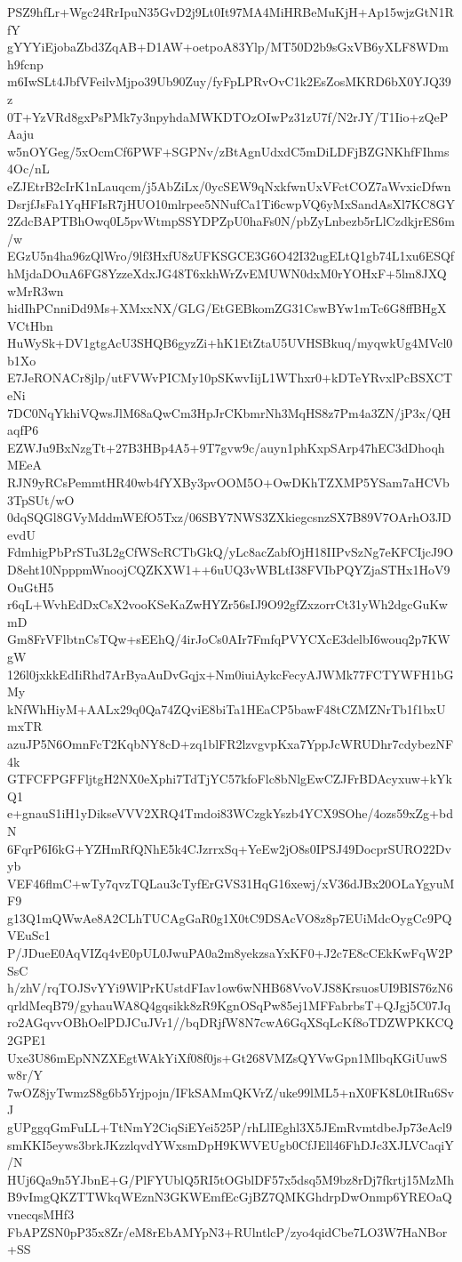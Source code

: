 PSZ9hfLr+Wgc24RrIpuN35GvD2j9Lt0It97MA4MiHRBeMuKjH+Ap15wjzGtN1RfY
gYYYiEjobaZbd3ZqAB+D1AW+oetpoA83Ylp/MT50D2b9sGxVB6yXLF8WDmh9fcnp
m6IwSLt4JbfVFeilvMjpo39Ub90Zuy/fyFpLPRvOvC1k2EsZosMKRD6bX0YJQ39z
0T+YzVRd8gxPsPMk7y3npyhdaMWKDTOzOIwPz31zU7f/N2rJY/T1Iio+zQePAaju
w5nOYGeg/5xOcmCf6PWF+SGPNv/zBtAgnUdxdC5mDiLDFjBZGNKhfFIhms4Oc/nL
eZJEtrB2cIrK1nLauqcm/j5AbZiLx/0ycSEW9qNxkfwnUxVFctCOZ7aWvxicDfwn
DsrjfJsFa1YqHFIsR7jHUO10mlrpee5NNufCa1Ti6cwpVQ6yMxSandAsXl7KC8GY
2ZdcBAPTBhOwq0L5pvWtmpSSYDPZpU0haFs0N/pbZyLnbezb5rLlCzdkjrES6m/w
EGzU5n4ha96zQlWro/9lf3HxfU8zUFKSGCE3G6O42I32ugELtQ1gb74L1xu6ESQf
hMjdaDOuA6FG8YzzeXdxJG48T6xkhWrZvEMUWN0dxM0rYOHxF+5lm8JXQwMrR3wn
hidIhPCnniDd9Ms+XMxxNX/GLG/EtGEBkomZG31CswBYw1mTc6G8ffBHgXVCtHbn
HuWySk+DV1gtgAcU3SHQB6gyzZi+hK1EtZtaU5UVHSBkuq/myqwkUg4MVcl0b1Xo
E7JeRONACr8jlp/utFVWvPICMy10pSKwvIijL1WThxr0+kDTeYRvxlPcBSXCTeNi
7DC0NqYkhiVQwsJlM68aQwCm3HpJrCKbmrNh3MqHS8z7Pm4a3ZN/jP3x/QHaqfP6
EZWJu9BxNzgTt+27B3HBp4A5+9T7gvw9c/auyn1phKxpSArp47hEC3dDhoqhMEeA
RJN9yRCsPemmtHR40wb4fYXBy3pvOOM5O+OwDKhTZXMP5YSam7aHCVb3TpSUt/wO
0dqSQGl8GVyMddmWEfO5Txz/06SBY7NWS3ZXkiegcsnzSX7B89V7OArhO3JDevdU
FdmhigPbPrSTu3L2gCfWScRCTbGkQ/yLc8acZabfOjH18IIPvSzNg7eKFCIjcJ9O
D8eht10NpppmWnoojCQZKXW1++6uUQ3vWBLtI38FVIbPQYZjaSTHx1HoV9OuGtH5
r6qL+WvhEdDxCsX2vooKSeKaZwHYZr56sIJ9O92gfZxzorrCt31yWh2dgcGuKwmD
Gm8FrVFlbtnCsTQw+sEEhQ/4irJoCs0AIr7FmfqPVYCXcE3delbI6wouq2p7KWgW
126l0jxkkEdIiRhd7ArByaAuDvGqjx+Nm0iuiAykcFecyAJWMk77FCTYWFH1bGMy
kNfWhHiyM+AALx29q0Qa74ZQviE8biTa1HEaCP5bawF48tCZMZNrTb1f1bxUmxTR
azuJP5N6OmnFcT2KqbNY8cD+zq1blFR2lzvgvpKxa7YppJcWRUDhr7cdybezNF4k
GTFCFPGFFljtgH2NX0eXphi7TdTjYC57kfoFlc8bNlgEwCZJFrBDAcyxuw+kYkQ1
e+gnauS1iH1yDikseVVV2XRQ4Tmdoi83WCzgkYszb4YCX9SOhe/4ozs59xZg+bdN
6FqrP6I6kG+YZHmRfQNhE5k4CJzrrxSq+YeEw2jO8s0IPSJ49DocprSURO22Dvyb
VEF46flmC+wTy7qvzTQLau3cTyfErGVS31HqG16xewj/xV36dJBx20OLaYgyuMF9
g13Q1mQWwAe8A2CLhTUCAgGaR0g1X0tC9DSAcVO8z8p7EUiMdcOygCc9PQVEuSc1
P/JDueE0AqVIZq4vE0pUL0JwuPA0a2m8yekzsaYxKF0+J2c7E8cCEkKwFqW2PSsC
h/zhV/rqTOJSvYYi9WlPrKUstdFIav1ow6wNHB68VvoVJS8KrsuosUI9BIS76zN6
qrldMeqB79/gyhauWA8Q4gqsikk8zR9KgnOSqPw85ej1MFFabrbsT+QJgj5C07Jq
ro2AGqvvOBhOelPDJCuJVr1//bqDRjfW8N7cwA6GqXSqLcKf8oTDZWPKKCQ2GPE1
Uxe3U86mEpNNZXEgtWAkYiXf08f0js+Gt268VMZsQYVwGpn1MlbqKGiUuwSw8r/Y
7wOZ8jyTwmzS8g6b5Yrjpojn/IFkSAMmQKVrZ/uke99lML5+nX0FK8L0tIRu6SvJ
gUPggqGmFuLL+TtNmY2CiqSiEYei525P/rhLlIEghl3X5JEmRvmtdbeJp73eAcl9
smKKI5eyws3brkJKzzlqvdYWxsmDpH9KWVEUgb0CfJEll46FhDJc3XJLVCaqiY/N
HUj6Qa9n5YJbnE+G/PlFYUblQ5RI5tOGblDF57x5dsq5M9bz8rDj7fkrtj15MzMh
B9vImgQKZTTWkqWEznN3GKWEmfEcGjBZ7QMKGhdrpDwOnmp6YREOaQvnecqsMHf3
FbAPZSN0pP35x8Zr/eM8rEbAMYpN3+RUlntlcP/zyo4qidCbe7LO3W7HaNBor+SS
